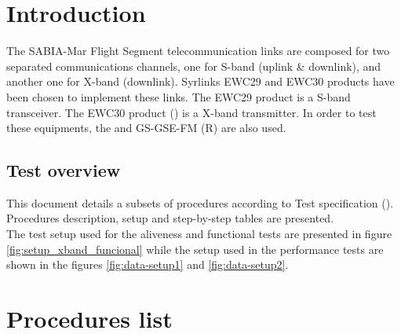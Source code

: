 \section{Introduction} \label{sec:int}


\newcommand{\TestPerfSetup}{Setup and configuration}
\newcommand{\TestPerfRFPXA}{Spectrum, power and BW with PXA}
\newcommand{\TestPerfCCDF}{CCDF measurement}
\newcommand{\TestPerfFreqS}{Frequency Stability}
\newcommand{\TestPerfCWPhaseN}{Carrier Phase Noise}
\newcommand{\TestPerfSpuriousDSN}{Spurious in DSN Band}
\newcommand{\TestPerfFilterVector}{Optimum filter confirmation And RF characterization with VSA and Cortex}
\newcommand{\TestPerfBer}{BER measurement}
\newcommand{\TestPerfSetupBreak}{Tests setup break}

The SABIA-Mar Flight Segment telecommunication links are composed for two separated
communications channels, one for S-band (uplink \& downlink), and another one for X-band
(downlink).\newline
Syrlinks EWC29 and EWC30 products have been chosen to implement these links.
The EWC29 product is a S-band transceiver. The EWC30 product () is a X-band transmitter. 
In order to test these equipments, the \comEgse\xspace and GS-GSE-FM (R) are also used.

\subsection{Test overview}

This document details a subsets of procedures according to Test specification ().
Procedures description, setup and step-by-step tables are presented.\\

The test setup used for the aliveness and functional tests are presented in figure \ref{fig:setup_xband_funcional} while
 the setup used in the performance tests are shown in the figures \ref{fig:data-setup1} and \ref{fig:data-setup2}.

\newpage
\section{Procedures list} \label{an:proc-list}

